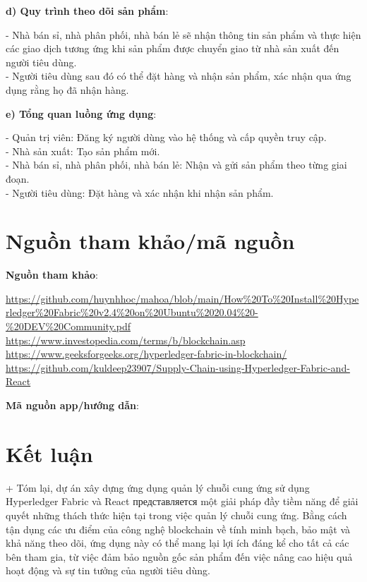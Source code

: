 \documentclass[a4paper,12pt]{article}
\begin{document}
\textbf{d) Quy trình theo dõi sản phẩm}:
\begin{itemize}
- Nhà bán sỉ, nhà phân phối, nhà bán lẻ sẽ nhận thông tin sản phẩm và thực hiện các giao dịch tương ứng khi sản phẩm được chuyển giao từ nhà sản xuất đến người tiêu dùng.\\
- Người tiêu dùng sau đó có thể đặt hàng và nhận sản phẩm, xác nhận qua ứng dụng rằng họ đã nhận hàng.\\
\end{itemize}

\textbf{e) Tổng quan luồng ứng dụng}:
\begin{itemize}
- Quản trị viên: Đăng ký người dùng vào hệ thống và cấp quyền truy cập.\\
- Nhà sản xuất: Tạo sản phẩm mới.\\
- Nhà bán sỉ, nhà phân phối, nhà bán lẻ: Nhận và gửi sản phẩm theo từng giai đoạn.\\
- Người tiêu dùng: Đặt hàng và xác nhận khi nhận sản phẩm.\\
\end{itemize}\vspace{10cm}
{\color{red} \section{Nguồn tham khảo/mã nguồn}}
\textbf{Nguồn tham khảo}:
\begin{itemize}
\url{https://github.com/huynhhoc/mahoa/blob/main/How%20To%20Install%20Hyperledger%20Fabric%20v2.4%20on%20Ubuntu%2020.04%20-%20DEV%20Community.pdf}
\url{https://www.investopedia.com/terms/b/blockchain.asp}
\url{https://www.geeksforgeeks.org/hyperledger-fabric-in-blockchain/}\\
\url{https://github.com/kuldeep23907/Supply-Chain-using-Hyperledger-Fabric-and-React}
\end{itemize}
\textbf{Mã nguồn app/hướng dẫn}: \\
{\color{red} \section{Kết luận}}
+ Tóm lại, dự án xây dựng ứng dụng quản lý chuỗi cung ứng sử dụng Hyperledger Fabric và React представляется một giải pháp đầy tiềm năng để giải quyết những thách thức hiện tại trong việc quản lý chuỗi cung ứng. Bằng cách tận dụng các ưu điểm của công nghệ blockchain về tính minh bạch, bảo mật và khả năng theo dõi, ứng dụng này có thể mang lại lợi ích đáng kể cho tất cả các bên tham gia, từ việc đảm bảo nguồn gốc sản phẩm đến việc nâng cao hiệu quả hoạt động và sự tin tưởng của người tiêu dùng.

\tableofcontents
\end{document}
